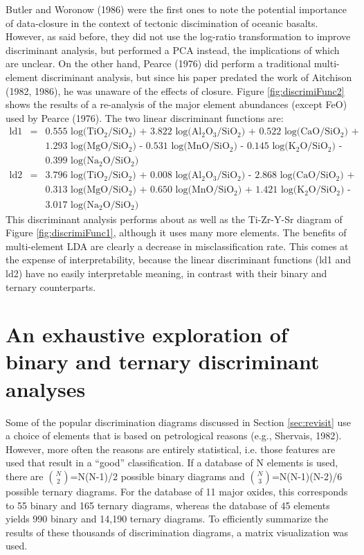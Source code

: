 \documentclass{article}
\begin{document}
Butler and  Woronow (1986) were the  first ones to  note the potential
importance of data-closure in the context of tectonic discimination of
oceanic  basalts.  However,  as  said  before, they  did  not use  the
log-ratio  transformation   to  improve  discriminant   analysis,  but
performed a PCA instead, the implications of which are unclear. On the
other  hand, Pearce  (1976)  did perform  a traditional  multi-element
discriminant  analysis,  but since  his  paper  predated  the work  of
Aitchison  (1982, 1986),  he was  unaware of  the effects  of closure.
Figure \ref{fig:discrimiFunc2}  shows the results of  a re-analysis of
the major element abundances (except  FeO) used by Pearce (1976).  The
two linear discriminant functions are:
\begin{eqnarray}
\nonumber \mbox{ld1}  &  = &
\mbox{0.555 log(TiO$_2$/SiO$_2$) + 3.822 log(Al$_2$O$_3$/SiO$_2$) + 0.522 log(CaO/SiO$_2$) +}\\
\nonumber ~ & ~ & 
\mbox{1.293 log(MgO/SiO$_2$) - 0.531 log(MnO/SiO$_2$) - 0.145 log(K$_2$O/SiO$_2$) -}\\
\nonumber ~ & ~ & 
\mbox{0.399 log(Na$_2$O/SiO$_2$)}\\
\nonumber \mbox{ld2} & = &
\mbox{3.796 log(TiO$_2$/SiO$_2$) + 0.008 log(Al$_2$O$_3$/SiO$_2$) -  2.868 log(CaO/SiO$_2$) +}\\
\nonumber ~ & ~ &
\mbox{0.313 log(MgO/SiO$_2$)   +   0.650 log(MnO/SiO$_2$)  +   1.421 log(K$_2$O/SiO$_2$) -}\\
~ & ~ & 
\mbox{3.017 log(Na$_2$O/SiO$_2$)}
\label{eq:ld_b}
\end{eqnarray}
This discriminant  analysis performs about  as well as  the Ti-Zr-Y-Sr
diagram of Figure \ref{fig:discrimiFunc1},  although it uses many more
elements. The benefits of multi-element  LDA are clearly a decrease in
misclassification    rate.    This   comes    at   the    expense   of
interpretability, because  the linear discriminant  functions (ld1 and
ld2)  have no  easily interpretable  meaning, in  contrast  with their
binary and ternary counterparts.

\section{An exhaustive exploration of binary and ternary discriminant analyses}
\label{sec:exhaustive}

Some  of  the popular  discrimination  diagrams  discussed in  Section
\ref{sec:revisit}  use   a  choice  of  elements  that   is  based  on
petrological reasons  (e.g., Shervais, 1982). However,  more often the
reasons are  entirely statistical, i.e.  those features  are used that
result in a  ``good'' classification.  If a database  of N elements is
used, there  are $\binom{N}{2}$=N(N-1)/2 possible  binary diagrams and
$\binom{N}{3}$=N(N-1)(N-2)/6  possible   ternary  diagrams.   For  the
database of  11 major  oxides, this corresponds  to 55 binary  and 165
ternary  diagrams, whereas  the  database of  45  elements yields  990
binary  and 14,190  ternary  diagrams.  To  efficiently summarize  the
results  of  these  thousands  of discrimination  diagrams,  a  matrix
visualization was used.
\end{document}
